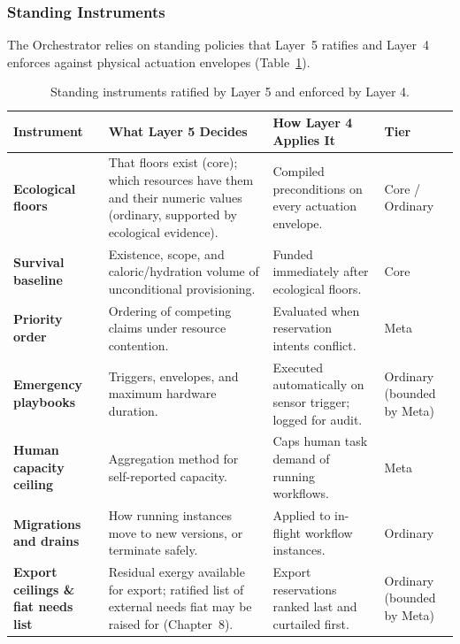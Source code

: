 \subsubsection{Standing Instruments}

The Orchestrator relies on standing policies that Layer~5 ratifies and Layer~4 enforces against physical actuation envelopes (Table~\ref{tab:l5-instruments}).

\begin{table}[htbp]
\centering
\small
\setlength{\tabcolsep}{3pt}
\begin{tabular}{|p{}|p{}|p{}|p{}|}
\hline
\textbf{Instrument} & \textbf{What Layer 5 Decides} & \textbf{How Layer 4 Applies It} & \textbf{Tier} \\
\hline
\textbf{Ecological floors} & That floors exist (core); which resources have them and their numeric values (ordinary, supported by ecological evidence). & Compiled preconditions on every actuation envelope. & Core / Ordinary \\
\hline
\textbf{Survival baseline} & Existence, scope, and caloric/hydration volume of unconditional provisioning. & Funded immediately after ecological floors. & Core \\
\hline
\textbf{Priority order} & Ordering of competing claims under resource contention. & Evaluated when reservation intents conflict. & Meta \\
\hline
\textbf{Emergency playbooks} & Triggers, envelopes, and maximum hardware duration. & Executed automatically on sensor trigger; logged for audit. & Ordinary (bounded by Meta) \\
\hline
\textbf{Human capacity ceiling} & Aggregation method for self-reported capacity. & Caps human task demand of running workflows. & Meta \\
\hline
\textbf{Migrations and drains} & How running instances move to new versions, or terminate safely. & Applied to in-flight workflow instances. & Ordinary \\
\hline
\textbf{Export ceilings \& fiat needs list} & Residual exergy available for export; ratified list of external needs fiat may be raised for (Chapter~8). & Export reservations ranked last and curtailed first. & Ordinary (bounded by Meta) \\
\hline
\end{tabular}
\caption{Standing instruments ratified by Layer 5 and enforced by Layer 4.}
\label{tab:l5-instruments}
\end{table}

